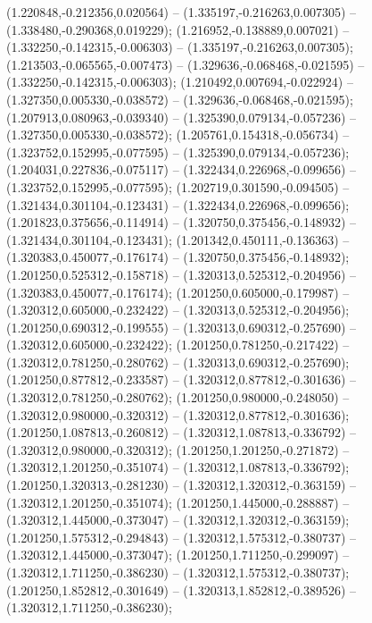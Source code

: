  (1.220848,-0.212356,0.020564) -- (1.335197,-0.216263,0.007305) -- (1.338480,-0.290368,0.019229);
 (1.216952,-0.138889,0.007021) -- (1.332250,-0.142315,-0.006303) -- (1.335197,-0.216263,0.007305);
 (1.213503,-0.065565,-0.007473) -- (1.329636,-0.068468,-0.021595) -- (1.332250,-0.142315,-0.006303);
 (1.210492,0.007694,-0.022924) -- (1.327350,0.005330,-0.038572) -- (1.329636,-0.068468,-0.021595);
 (1.207913,0.080963,-0.039340) -- (1.325390,0.079134,-0.057236) -- (1.327350,0.005330,-0.038572);
 (1.205761,0.154318,-0.056734) -- (1.323752,0.152995,-0.077595) -- (1.325390,0.079134,-0.057236);
 (1.204031,0.227836,-0.075117) -- (1.322434,0.226968,-0.099656) -- (1.323752,0.152995,-0.077595);
 (1.202719,0.301590,-0.094505) -- (1.321434,0.301104,-0.123431) -- (1.322434,0.226968,-0.099656);
 (1.201823,0.375656,-0.114914) -- (1.320750,0.375456,-0.148932) -- (1.321434,0.301104,-0.123431);
 (1.201342,0.450111,-0.136363) -- (1.320383,0.450077,-0.176174) -- (1.320750,0.375456,-0.148932);
 (1.201250,0.525312,-0.158718) -- (1.320313,0.525312,-0.204956) -- (1.320383,0.450077,-0.176174);
 (1.201250,0.605000,-0.179987) -- (1.320312,0.605000,-0.232422) -- (1.320313,0.525312,-0.204956);
 (1.201250,0.690312,-0.199555) -- (1.320313,0.690312,-0.257690) -- (1.320312,0.605000,-0.232422);
 (1.201250,0.781250,-0.217422) -- (1.320312,0.781250,-0.280762) -- (1.320313,0.690312,-0.257690);
 (1.201250,0.877812,-0.233587) -- (1.320312,0.877812,-0.301636) -- (1.320312,0.781250,-0.280762);
 (1.201250,0.980000,-0.248050) -- (1.320312,0.980000,-0.320312) -- (1.320312,0.877812,-0.301636);
 (1.201250,1.087813,-0.260812) -- (1.320312,1.087813,-0.336792) -- (1.320312,0.980000,-0.320312);
 (1.201250,1.201250,-0.271872) -- (1.320312,1.201250,-0.351074) -- (1.320312,1.087813,-0.336792);
 (1.201250,1.320313,-0.281230) -- (1.320312,1.320312,-0.363159) -- (1.320312,1.201250,-0.351074);
 (1.201250,1.445000,-0.288887) -- (1.320312,1.445000,-0.373047) -- (1.320312,1.320312,-0.363159);
 (1.201250,1.575312,-0.294843) -- (1.320312,1.575312,-0.380737) -- (1.320312,1.445000,-0.373047);
 (1.201250,1.711250,-0.299097) -- (1.320312,1.711250,-0.386230) -- (1.320312,1.575312,-0.380737);
 (1.201250,1.852812,-0.301649) -- (1.320313,1.852812,-0.389526) -- (1.320312,1.711250,-0.386230);
